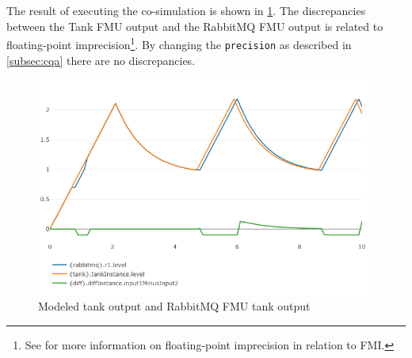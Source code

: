The result of executing the co-simulation is shown in \cref{fig:modelled-tank-vs-rabbitmq-fmu-tank}. The discrepancies
between the Tank FMU output and the RabbitMQ FMU output is related to
floating-point imprecision\footnote{See \cite{Cremona2019} for more information on floating-point
  imprecision in relation to FMI.}. By changing the \texttt{precision} as described in
\cref{subsec:cqa} there are no discrepancies.
\begin{figure}[!htb]
  \centering
  \includegraphics[width=\textwidth]{figures/lfmqtt.png}
  \caption{Modeled tank output and RabbitMQ FMU tank output}
  \label{fig:modelled-tank-vs-rabbitmq-fmu-tank}
\end{figure}





